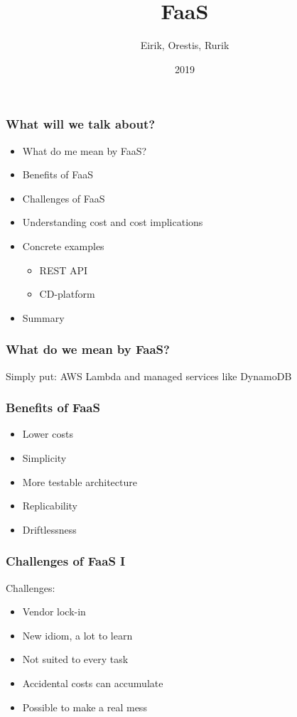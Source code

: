 \documentclass{beamer}
\title{FaaS}
\author{Eirik, Orestis, Rurik}
\institute{Institute for Economic Affairs — ML-faktion}
\date{2019}
\begin{document}
\frame{\titlepage}

\begin{frame}
\frametitle{What will we talk about?}
\begin{itemize}
  \item What do me mean by FaaS?
  \item Benefits of FaaS
  \item Challenges of FaaS
  \item Understanding cost and cost implications
  \item Concrete examples
  \begin{itemize}
    \item REST API
    \item CD-platform
  \end{itemize}
  \item Summary
\end{itemize}
\end{frame}

\begin{frame}
\frametitle{What do we mean by FaaS?}
Simply put: AWS Lambda and managed services like DynamoDB
\end{frame}

\begin{frame}
\frametitle{Benefits of FaaS}
\begin{itemize}
  \item Lower costs
  \item Simplicity
  \item More testable architecture
  \item Replicability
  \item Driftlessness
\end{itemize}
\end{frame}

\begin{frame}
\frametitle{Challenges of FaaS I}
Challenges:
\begin{itemize}
  \item Vendor lock-in
  \item New idiom, a lot to learn
  \item Not suited to every task
  \item Accidental costs can accumulate
  \item Possible to make a real mess
\end{itemize}
\end{frame}
\end{document}
